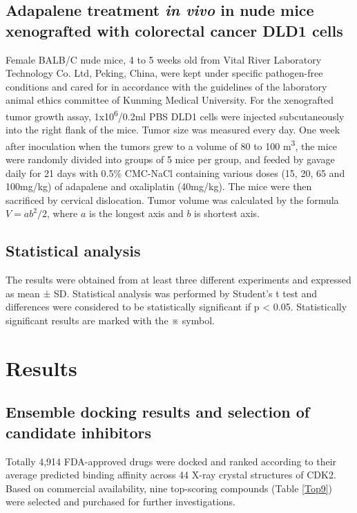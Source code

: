\documentclass[10pt]{article}
\begin{document}
\subsection*{Adapalene treatment \textit{in vivo} in nude mice xenografted with colorectal cancer DLD1 cells}

Female BALB/C nude mice, 4 to 5 weeks old from Vital River Laboratory Technology Co. Ltd, Peking, China, were kept under specific pathogen-free conditions and cared for in accordance with the guidelines of the laboratory animal ethics committee of Kunming Medical University. For the xenografted tumor growth assay, 1x10\textsuperscript{6}/0.2ml PBS DLD1 cells were injected subcutaneously into the right flank of the mice. Tumor size was measured every day. One week after inoculation when the tumors grew to a volume of 80 to 100 m\textsuperscript{3}, the mice were randomly divided into groups of 5 mice per group, and feeded by gavage daily for 21 days with 0.5\% CMC-NaCl containing various doses (15, 20, 65 and 100mg/kg) of adapalene and oxaliplatin (40mg/kg). The mice were then sacrificed by cervical dislocation. Tumor volume was calculated by the formula $V=ab^2/2$, where $a$ is the longest axis and $b$ is shortest axis.

\subsection*{Statistical analysis}

The results were obtained from at least three different experiments and expressed as mean ± SD. Statistical analysis was performed by Student’s t test and differences were considered to be statistically significant if p < 0.05. Statistically significant results are marked with the ※ symbol.

\section*{Results}

\subsection*{Ensemble docking results and selection of candidate inhibitors}

Totally 4,914 FDA-approved drugs were docked and ranked according to their average predicted binding affinity across 44 X-ray crystal structures of CDK2. Based on commercial availability, nine top-scoring compounds (Table \ref{Top9}) were selected and purchased for further investigations.
\end{document}
